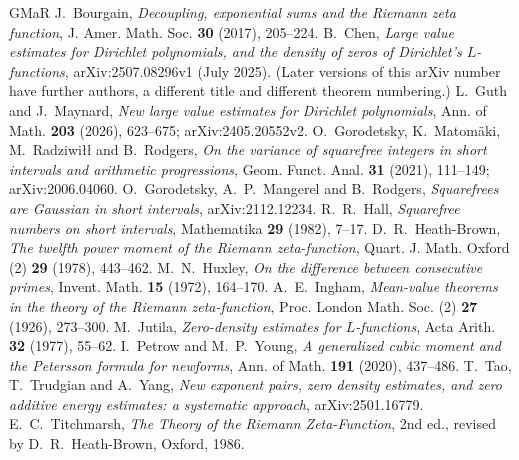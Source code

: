\documentclass[11pt]{amsart}
\theoremstyle{remark}
\begin{document}
\begin{thebibliography}{GMaR}
 J.~Bourgain, \emph{Decoupling, exponential sums and the Riemann
  zeta function}, J. Amer. Math. Soc. \textbf{30} (2017), 205--224.
 B.~Chen, \emph{Large value estimates for Dirichlet polynomials,
  and the density of zeros of Dirichlet's $L$-functions}, arXiv:2507.08296v1
  (July 2025).  (Later versions of this arXiv number have further authors, a
  different title and different theorem numbering.)
 L.~Guth and J.~Maynard, \emph{New large value estimates for
  Dirichlet polynomials}, Ann. of Math. \textbf{203} (2026), 623--675;
  arXiv:2405.20552v2.
 O.~Gorodetsky, K.~Matom\"aki, M.~Radziwi\l{}\l{} and
  B.~Rodgers, \emph{On the variance of squarefree integers in short intervals and
  arithmetic progressions}, Geom. Funct. Anal. \textbf{31} (2021), 111--149;
  arXiv:2006.04060.
 O.~Gorodetsky, A.~P.~Mangerel and B.~Rodgers,
  \emph{Squarefrees are Gaussian in short intervals}, arXiv:2112.12234.
 R.~R.~Hall, \emph{Squarefree numbers on short intervals},
  Mathematika \textbf{29} (1982), 7--17.
 D.~R.~Heath-Brown, \emph{The twelfth power moment of the
  Riemann zeta-function}, Quart. J. Math. Oxford (2) \textbf{29} (1978), 443--462.
 M.~N.~Huxley, \emph{On the difference between consecutive
  primes}, Invent. Math. \textbf{15} (1972), 164--170.
 A.~E.~Ingham, \emph{Mean-value theorems in the theory of the
  Riemann zeta-function}, Proc. London Math. Soc. (2) \textbf{27} (1926), 273--300.
 M.~Jutila, \emph{Zero-density estimates for $L$-functions},
  Acta Arith. \textbf{32} (1977), 55--62.
 I.~Petrow and M.~P.~Young, \emph{A generalized cubic moment and
  the Petersson formula for newforms}, Ann. of Math. \textbf{191} (2020), 437--486.
 T.~Tao, T.~Trudgian and A.~Yang, \emph{New exponent pairs,
  zero density estimates, and zero additive energy estimates: a systematic
  approach}, arXiv:2501.16779.
 E.~C.~Titchmarsh, \emph{The Theory of the Riemann
  Zeta-Function}, 2nd ed., revised by D.~R.~Heath-Brown, Oxford, 1986.
\end{thebibliography}
\end{document}
